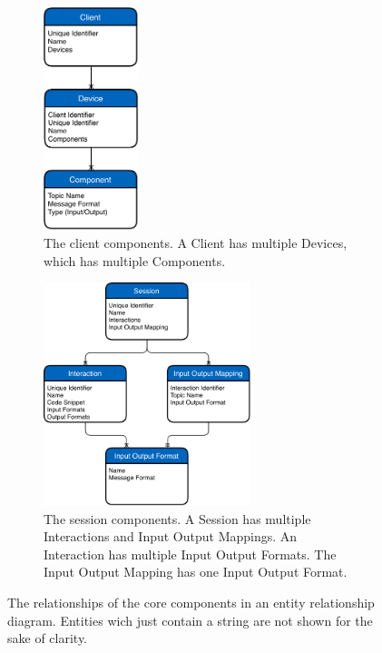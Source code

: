 \begin{figure}[H]
	\centering
	\begin{subfigure}[t]{.48\textwidth}
		\centering
		\includegraphics[height=6.5cm]{figures/implementation/ubii_er_client.pdf}
		\caption{The client components. A Client has multiple Devices, which has multiple Components.}\label{fig:ubii-er-client}
  \end{subfigure}%
  \hspace{0.04\textwidth}%
	\begin{subfigure}[t]{.48\textwidth}
		\centering
		\includegraphics[height=6.5cm]{figures/implementation/ubii_er_server.pdf}
		\caption{The session components. A Session has multiple Interactions and Input Output Mappings. An Interaction has multiple Input Output Formats. The Input Output Mapping has one Input Output Format.}\label{fig:ubii-er-server}
	\end{subfigure}
	\caption[UBII components diagram]{The relationships of the core components in an entity relationship diagram.  Entities wich just contain a string are not shown for the sake of clarity.}\label{fig:ubii-er}
\end{figure}

